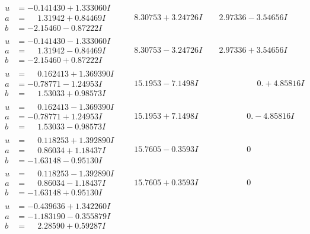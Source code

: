 \documentclass[1p]{elsarticle_modified}
\theoremstyle{definition}
\begin{document}
$$\begin{array}{c|c|c}
\begin{aligned}
u &= -0.141430 + 1.333060 I \\
a &= \phantom{-}1.31942 + 0.84469 I \\
b &= -2.15460 - 0.87222 I\end{aligned}
 & \phantom{-}8.30753 + 3.24726 I & \phantom{-}2.97336 - 3.54656 I \\ \hline\begin{aligned}
u &= -0.141430 - 1.333060 I \\
a &= \phantom{-}1.31942 - 0.84469 I \\
b &= -2.15460 + 0.87222 I\end{aligned}
 & \phantom{-}8.30753 - 3.24726 I & \phantom{-}2.97336 + 3.54656 I \\ \hline\begin{aligned}
u &= \phantom{-}0.162413 + 1.369390 I \\
a &= -0.78771 - 1.24953 I \\
b &= \phantom{-}1.53033 + 0.98573 I\end{aligned}
 & \phantom{-}15.1953 - 7.1498 I & \phantom{-0.000000 -}0. + 4.85816 I \\ \hline\begin{aligned}
u &= \phantom{-}0.162413 - 1.369390 I \\
a &= -0.78771 + 1.24953 I \\
b &= \phantom{-}1.53033 - 0.98573 I\end{aligned}
 & \phantom{-}15.1953 + 7.1498 I & \phantom{-0.000000 } 0. - 4.85816 I \\ \hline\begin{aligned}
u &= \phantom{-}0.118253 + 1.392890 I \\
a &= \phantom{-}0.86034 + 1.18437 I \\
b &= -1.63148 - 0.95130 I\end{aligned}
 & \phantom{-}15.7605 - 0.3593 I & \phantom{-0.000000 } 0 \\ \hline\begin{aligned}
u &= \phantom{-}0.118253 - 1.392890 I \\
a &= \phantom{-}0.86034 - 1.18437 I \\
b &= -1.63148 + 0.95130 I\end{aligned}
 & \phantom{-}15.7605 + 0.3593 I & \phantom{-0.000000 } 0 \\ \hline\begin{aligned}
u &= -0.439636 + 1.342260 I \\
a &= -1.183190 - 0.355879 I \\
b &= \phantom{-}2.28590 + 0.59287 I\end{aligned}

\end{array}$$
\end{document}
